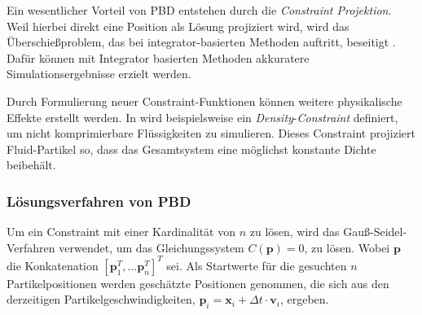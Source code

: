 Ein wesentlicher Vorteil von PBD entstehen durch die \textit{Constraint Projektion}. 
Weil hierbei direkt eine Position als Lösung projiziert wird,
wird das Überschießproblem, das bei integrator-basierten Methoden 
auftritt, beseitigt \cite{PBD}. 
Dafür können mit Integrator basierten Methoden akkuratere Simulationsergebnisse erzielt werden.

Durch Formulierung neuer Constraint-Funktionen können weitere physikalische \linebreak Effekte erstellt werden. In \cite{UPP} wird beispielsweise ein \newline \textit{Density}-\textit{Constraint} definiert, um nicht komprimierbare Flüssigkeiten zu simulieren. Dieses Constraint projiziert Fluid-Partikel so, dass das Gesamtsystem eine möglichst konstante Dichte beibehält.



\subsubsection{Lösungsverfahren von PBD}

Um ein Constraint mit einer Kardinalität von $n$ zu lösen, wird das Gauß-Seidel-Verfahren verwendet, um das Gleichungssystem $C(\textbf{p})=0$, zu lösen. Wobei $\textbf{p}$ die Konkatenation $[\textbf{p}_1^T,...\textbf{p}_n^T]^T$ sei.
Als Startwerte für die gesuchten $n$ Partikelpositionen werden geschätzte Positionen genommen, die sich aus den derzeitigen Partikelgeschwindigkeiten, $\textbf{p}_i = \textbf{x}_i + \Delta t \cdot \textbf{v}_i$, ergeben. 

